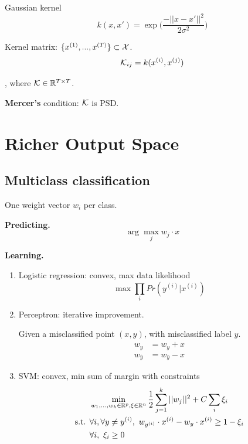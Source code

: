 \documentclass[a4paper]{report}
\begin{document}
Gaussian kernel
$$
k(x, x') = \exp\Bigg(\frac{-||x-x'||^2}{2\sigma^2}\Bigg)
$$


Kernel matrix: $\{x^{(1)},...,x^{(T)}\}\subset \mathcal{X}$. 
$$
\mathcal{K}_{ij} = k(x^{(i)}, x^{(j)}) 
$$

, where $\mathcal{K}\in \mathbb{R}^{T\times T}$.

\textbf{Mercer's} condition: $\mathcal{K}$ is PSD.

\chapter{Richer Output Space} 
\section{Multiclass classification}
One weight vector $w_i$ per class. 

\textbf{Predicting.} 
$$
\arg\max_j w_j \cdot x
$$

\textbf{Learning.}
\begin{enumerate}
\item Logistic regression: convex, max data likelihood
$$
\max \prod_i Pr(y^{(i)}|x^{(i)})
$$
\item Perceptron: iterative improvement.

Given a misclassified point $(x, y)$, with misclassified label $\hat y$.
\begin{align*}
w_y &= w_y + x \\
w_{\hat y} &= w_{\hat y} - x
\end{align*}
\item SVM: convex, min sum of margin with constraints
\begin{align*}
&\min_{w_1, ..., w_k \in \mathbb{R}^p, \xi\in \mathbb{R}^n} \frac{1}{2}\sum_{j=1}^k ||w_j||^2+C\sum_i \xi_i \\
\text{s.t. } &\forall i, \forall y \neq y^{(i)},~ w_{y^{(i)}}\cdot x^{(i)} - w_y \cdot x^{(i)} \geq 1-\xi_i \\
& \forall i,~ \xi_i\geq0
\end{align*}
\end{enumerate}
\end{document}
